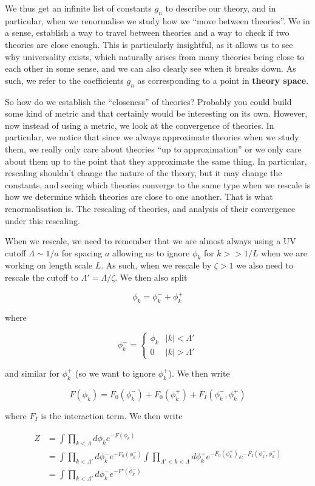 \documentclass{article}
\theoremstyle{definition}
\begin{document}
We thus get an infinite list of constants $g_n$ to describe our theory, and in
particular, when we renormalise we study how we ``move between theories''. We in
a sense, establish a way to travel between theories and a way to check if two
theories are close enough. This is particularly insightful, as it allows us to
see why universality exists, which naturally arises from many theories being
close to each other in some sense, and we can also clearly see when it breaks
down. As such, we refer to the coefficients $g_n$ as corresponding to a point in
\textbf{theory space}. 

So how do we establish the ``closeness'' of theories? Probably you could build
some kind of metric and that certainly would be interesting on its own. However,
now instead of using a metric, we look at the convergence of theories. In
particular, we notice that since we always approximate theories when we study
them, we really only care about theories ``up to approximation'' or we only care
about them up to the point that they approximate the same thing. In particular,
rescaling shouldn't change the nature of the theory, but it may change the
constants, and seeing which theories converge to the same type when we rescale
is how we determine which theories are close to one another. That is what
renormalisation is. The rescaling of theories, and analysis of their convergence
under this rescaling.

When we rescale, we need to remember that we are almost always using a UV cutoff
$\Lambda \sim 1/a$ for spacing $a$ allowing us to ignore $\phi_k$ for $k >> 1 /
L$ when we are working on length scale $L$. As such, when we rescale by $\zeta >
1$ we also need to rescale the cutoff to $\Lambda' = \Lambda / \zeta$. We then
also split

$$ \phi_k = \phi_k^- + \phi_k^+ $$

where

$$ \phi_k^- =
\begin{cases}
  \phi_k & |k| < \Lambda' \\
  0 & |k| > \Lambda'
\end{cases}
$$

and similar for $\phi_k^+$ (so we want to ignore $\phi_k^+$). We then write

$$ F(\phi_k) = F_0(\phi_k^-) + F_0(\phi_k^+) + F_I(\phi_k^-, \phi_k^+) $$

where $F_I$ is the interaction term. We then write

\begin{align*}
  Z &= \int \prod_{k < \Lambda} d\phi_k e^{-F(\phi_k)} \\
    &= \int \prod_{k < \Lambda'} d\phi_k^- e^{-F_0(\phi_k^-)} \int \prod_{\Lambda' < k < \Lambda} d \phi_k^+ e^{-F_0(\phi_k^+)} e^{-F_I(\phi_k^-, \phi_k^+)} \\
    &= \int \prod_{k < \Lambda'} d\phi_k^- e^{-F'(\phi_k^-)}
\end{align*}
\end{document}

